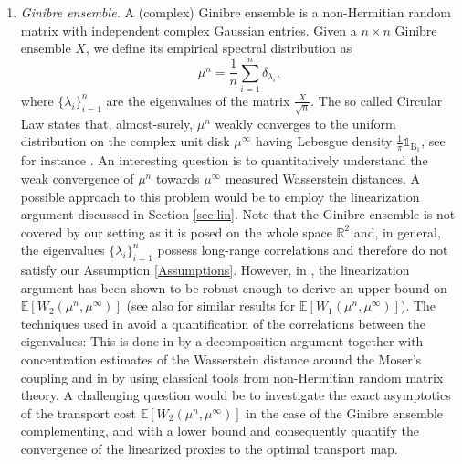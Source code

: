 \documentclass[11pt,a4paper,oneside]{amsart}
\numberwithin{equation}{section}
\newcommand{\bb}{\text{B}}
\begin{document}
\begin{enumerate}
%
\item \emph{Ginibre ensemble. }A (complex) Ginibre ensemble is a non-Hermitian random matrix with independent complex Gaussian entries. Given a $n\times n$ Ginibre ensemble $X$, we define its empirical spectral distribution as 
\[
\mu^n = \frac 1n \sum_{i=1}^n \delta_{\lambda_i },
\]
where $\{\lambda_i\}_{i=1}^n$ are the eigenvalues of the matrix $\frac{X}{\sqrt n}$. The so called Circular Law states that, almost-surely, $\mu^n$ weakly converges to the uniform distribution on the complex unit disk $\mu^\infty$ having Lebesgue density $\frac1\pi \mathds{1}_{\bb_1}$, see for instance \cite[Theorem 1.10]{TaoVu}. An interesting question is to quantitatively understand the weak convergence of $\mu^n$ towards $\mu^\infty$ measured Wasserstein distances. A possible approach to this problem would be to employ the linearization argument discussed in Section \ref{sec:lin}. Note that the Ginibre ensemble is not covered by our setting as it is posed on the whole space $\mathbb{R}^2$ and, in general, the eigenvalues $\{\lambda_i\}_{i=1}^n$ possess long-range correlations and therefore do not satisfy our Assumption \ref{Assumptions}. However, in \cite[Th\'eor\`eme 3.1.1]{maxime}, the linearization argument has been shown to be robust enough to derive an upper bound on $\mathbb{E}[W_2(\mu^n, \mu^\infty)]$ (see also \cite[Theorem 1.3]{Jonas} for similar results for $\mathbb{E}[W_1(\mu^n, \mu^\infty)]$). %
The techniques used in \cite{maxime, Jonas} avoid a quantification of the correlations between the eigenvalues: This is done in \cite{maxime} by a decomposition argument together with concentration estimates of the Wasserstein distance around the Moser's coupling and in \cite{Jonas} by using classical tools from non-Hermitian random matrix theory. A challenging question would be to investigate the exact asymptotics of the transport cost $\mathbb{E}[W_2(\mu^n, \mu^\infty)]$ in the case of the Ginibre ensemble complementing, \cite[Th\'eor\`eme 3.1.1]{maxime} and \cite[Theorem 1.3]{Jonas} with a lower bound and consequently quantify the convergence of the linearized proxies to the optimal transport map. 


\end{enumerate}
\end{document}
